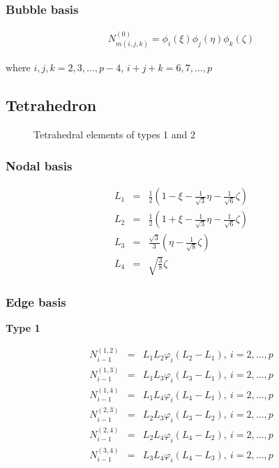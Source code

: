 \subsubsection{Bubble basis}

\begin{eqnarray*}
N_{m(i,j,k)}^{(0)}=\phi_i(\xi)\phi_j(\eta)\phi_k(\zeta)
\end{eqnarray*}

\noindent where $i,j,k=2,3,\ldots,p-4$, $i+j+k=6,7,\ldots,p$

\subsection{Tetrahedron}

\begin{figure}[tbhp]
\begin{minipage}{.5\textwidth}
\begin{center}

\end{center}
\end{minipage}
\begin{minipage}{.5\textwidth}
\begin{center}

\end{center}
\end{minipage}
\caption{Tetrahedral elements of types 1 and 2}
\end{figure}

\subsubsection{Nodal basis}

\begin{eqnarray*}
L_1&=&\frac{1}{2}(1-\xi-\frac{1}
{\sqrt{3}}\eta-\frac{1}{\sqrt{6}}\zeta) \\
L_2&=&\frac{1}{2}(1+\xi-\frac{1}
{\sqrt{3}}\eta-\frac{1}{\sqrt{6}}\zeta) \\
L_3&=&\frac{\sqrt{3}}{3}(\eta-\frac{1}{\sqrt{8}}\zeta) \\
L_4&=&\sqrt{\frac{3}{8}}\zeta
\end{eqnarray*}

\subsubsection{Edge basis}

\noindent \textbf{Type 1}

\begin{eqnarray*}
N_{i-1}^{(1,2)}&=&L_1L_2\varphi_i(L_2-L_1),\ i=2,\ldots,p \\
N_{i-1}^{(1,3)}&=&L_1L_3\varphi_i(L_3-L_1),\ i=2,\ldots,p \\
N_{i-1}^{(1,4)}&=&L_1L_4\varphi_i(L_4-L_1),\ i=2,\ldots,p \\
N_{i-1}^{(2,3)}&=&L_2L_3\varphi_i(L_3-L_2),\ i=2,\ldots,p \\
N_{i-1}^{(2,4)}&=&L_2L_4\varphi_i(L_4-L_2),\ i=2,\ldots,p \\
N_{i-1}^{(3,4)}&=&L_3L_4\varphi_i(L_4-L_3),\ i=2,\ldots,p 
\end{eqnarray*}

